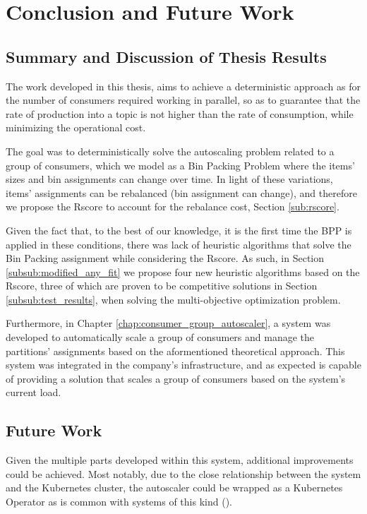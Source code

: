 \chapter{Conclusion and Future Work} 
\label{chap:conclusions}

\section{Summary and Discussion of Thesis Results}

The work developed in this thesis, aims to achieve a deterministic approach as
for the number of consumers required working in parallel, so as to guarantee
that the rate of production into a topic is not higher than the rate of
consumption, while minimizing the operational cost.

The goal was to deterministically solve the autoscaling problem related to a
group of consumers, which we model as a Bin Packing Problem where the items'
sizes and bin assignments can change over time. In light of these variations,
items' assignments can be rebalanced (bin assignment can change), and therefore
we propose the Rscore to account for the rebalance cost, Section
\ref{sub:rscore}.

Given the fact that, to the best of our knowledge, it is the first time the BPP
is applied in these conditions, there was lack of heuristic algorithms that
solve the Bin Packing assignment while considering the Rscore. As such, in
Section \ref{subsub:modified_any_fit} we propose four new heuristic algorithms
based on the Rscore, three of which are proven to be competitive solutions in
Section \ref{subsub:test_results}, when solving the multi-objective optimization
problem.

Furthermore, in Chapter \ref{chap:consumer_group_autoscaler}, a system was
developed to automatically scale a group of consumers and manage the partitions'
assignments based on the aformentioned theoretical approach. This system was
integrated in the company's infrastructure, and as expected is capable of
providing a solution that scales a group of consumers based on the system's
current load.

\section{Future Work}

Given the multiple parts developed within this system, additional improvements
could be achieved. Most notably, due to the close relationship between the system
and the Kubernetes cluster, the autoscaler could be wrapped as a Kubernetes
Operator \cite{KuberenetesOperator} as is common with systems of this kind
(\cite{Kubegres, PulumiOperator, KEDA}).

